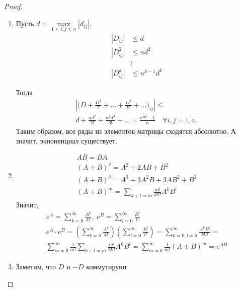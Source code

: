 \begin{proof}
    \begin{enumerate}
        \item Пусть $d = \max\limits_{1 \leqslant i, j \leqslant n} |d_{ij}|$.
            \begin{align*}
                |D_{ij}| &\leqslant d \\
                |D^2_{ij}| &\leqslant nd^2 \\
                &\vdots \\
                |D^k_{ij}| &\leqslant n^{k-1} d^k 
            \end{align*}
        
            Тогда 
            \begin{gather*}
                \left| \biggl( D + \frac{D^2}{2} + \ldots + \frac{D^k}{k!} + \ldots \biggr)_{ij} \right| \leqslant \\
                d + \frac{nd^2}{2!} + \frac{n^2 d^3}{3!} + \ldots = \frac{e^{nd} - 1}{n} \quad \forall i, j = \overline{1, n}.
            \end{gather*}
            Таким образом, все ряды из элементов матрицы сходятся абсолютно.
            А значит, экпоненциал существует.
        \item \begin{gather*}
                AB = BA \\
                (A + B)^2 = A^2 + 2AB + B^2 \\
                (A + B)^3 = A^3 + 3A^2B + 3AB^2 + B^3 \\
                (A + B)^m = \sum\limits_{k + l = m} \frac{m!}{k! l!} A^k B^l
            \end{gather*}
            Значит,
            \begin{gather*}
                e^A = \sum\limits_{k = 0}^{\infty} \frac{A^k}{k!}, \;
                e^B = \sum\limits_{l = 0}^{\infty} \frac{B^l}{l!} \\
                e^A \cdot e^B = \left( \sum\limits_{k = 0}^{\infty} \frac{A^k}{k!} \right) \left( \sum\limits_{l = 0}^{\infty} \frac{B^l}{l!} \right) =
                \sum\limits_{k = 0, l = 0}^{\infty} \frac{A^k B^l}{k! l!} = \\
                \sum\limits_{m = 0}^\infty \frac{1}{m!} \sum\limits_{k + l = m} \frac{m!}{k! l!} A^k B^l = 
                \sum\limits_{m = 0}^\infty \frac{1}{m!} (A + B)^m = 
                e^{AB}
            \end{gather*}
        \item Заметим, что $D$ и $-D$ коммутируют.

\end{enumerate}
\end{proof}
